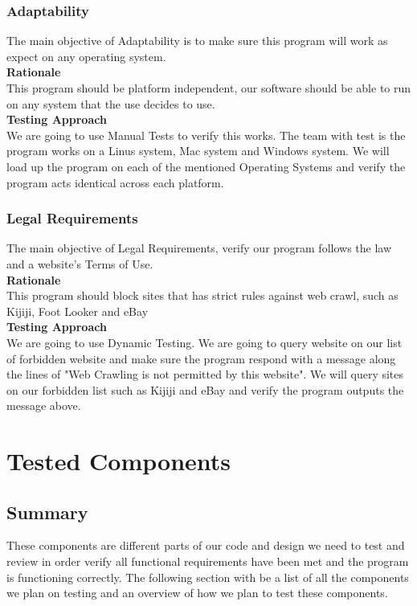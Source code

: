 \documentclass[12pt, titlepage]{article}
\begin{document}
\subsubsection{Adaptability}
The main objective of Adaptability is to make sure this program will work as expect on any operating system.\\

\textbf{Rationale}  \\

This program should be platform independent, our software should be able to run on any system that the use decides to use.\\

\textbf{Testing Approach} \\ 

 We are going to use Manual Tests to verify this works. The team with test is the program works on a Linus system, Mac system and Windows system. We will load up the program on each of the mentioned Operating Systems and verify the program acts identical across each platform.

\subsubsection{Legal Requirements }
The main objective of Legal Requirements, verify our program follows the law and a website's Terms of Use.\\

\textbf{Rationale}  \\

This program should block sites that has strict rules against web crawl, such as Kijiji, Foot Looker and eBay\\

\textbf{Testing Approach} \\ 

 We are going to use Dynamic Testing. We are going to query website on our list of forbidden website and make sure the program respond with a message along the lines of "Web Crawling is not permitted by this website". We will query sites on our forbidden list such as Kijiji and eBay and verify the program outputs the message above.
 
 
\section{Tested Components}
\subsection{Summary}
These components are different parts of our code and design we need to test and review in order verify all functional requirements have been met and the program is functioning correctly. The following section with be a list of all the components we plan on testing and an overview of how we plan to test these components. 
\end{document}
